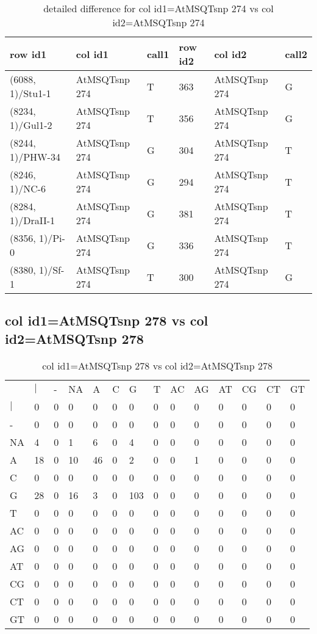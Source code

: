 \begin{center}
\begin{longtable}{|l|l|l|l|l|l|}
\caption{detailed difference for col id1=AtMSQTsnp 274 vs col id2=AtMSQTsnp 274} \label{table_dm615}\\
\hline
row id1&col id1&call1&row id2&col id2&call2\\
\hline
(6088, 1)/Stu1-1&AtMSQTsnp 274&T&363&AtMSQTsnp 274&G\\
(8234, 1)/Gul1-2&AtMSQTsnp 274&T&356&AtMSQTsnp 274&G\\
(8244, 1)/PHW-34&AtMSQTsnp 274&G&304&AtMSQTsnp 274&T\\
(8246, 1)/NC-6&AtMSQTsnp 274&G&294&AtMSQTsnp 274&T\\
(8284, 1)/DraII-1&AtMSQTsnp 274&G&381&AtMSQTsnp 274&T\\
(8356, 1)/Pi-0&AtMSQTsnp 274&G&336&AtMSQTsnp 274&T\\
(8380, 1)/Sf-1&AtMSQTsnp 274&T&300&AtMSQTsnp 274&G\\
\hline
\end{longtable}
\end{center}

\subsection{col id1=AtMSQTsnp 278 vs col id2=AtMSQTsnp 278}
\begin{center}
\begin{longtable}{|l|l|l|l|l|l|l|l|l|l|l|l|l|l|}
\caption{col id1=AtMSQTsnp 278 vs col id2=AtMSQTsnp 278} \label{table_dm616}\\
\hline
\\
\hline
&$|$&-&NA&A&C&G&T&AC&AG&AT&CG&CT&GT\\
$|$&0&0&0&0&0&0&0&0&0&0&0&0&0\\
-&0&0&0&0&0&0&0&0&0&0&0&0&0\\
NA&4&0&1&6&0&4&0&0&0&0&0&0&0\\
A&18&0&10&46&0&2&0&0&1&0&0&0&0\\
C&0&0&0&0&0&0&0&0&0&0&0&0&0\\
G&28&0&16&3&0&103&0&0&0&0&0&0&0\\
T&0&0&0&0&0&0&0&0&0&0&0&0&0\\
AC&0&0&0&0&0&0&0&0&0&0&0&0&0\\
AG&0&0&0&0&0&0&0&0&0&0&0&0&0\\
AT&0&0&0&0&0&0&0&0&0&0&0&0&0\\
CG&0&0&0&0&0&0&0&0&0&0&0&0&0\\
CT&0&0&0&0&0&0&0&0&0&0&0&0&0\\
GT&0&0&0&0&0&0&0&0&0&0&0&0&0\\
\hline
\end{longtable}
\end{center}

